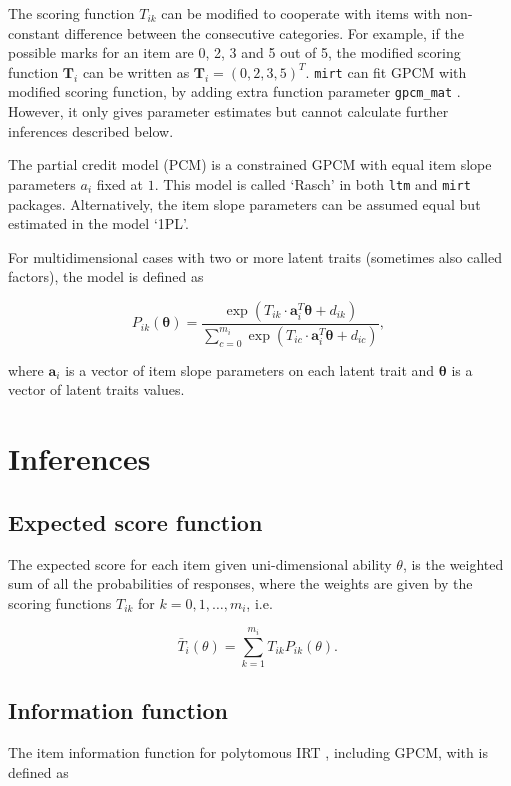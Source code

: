 \documentclass[a4paper]{report}
\begin{document}
The scoring function $T_{ik}$ can be modified to cooperate with items with non-constant difference between the consecutive categories. For example, if the possible marks for an item are 0, 2, 3 and 5 out of 5, the modified scoring function $\boldsymbol T_i$ can be written as $\boldsymbol T_i = (0,2,3,5)^T$. \texttt{mirt} can fit GPCM with modified scoring function, by adding extra function parameter \texttt{gpcm\_mat} \cite{mirt}. However, it only gives parameter estimates but cannot calculate further inferences described below. 

The partial credit model (PCM) is a constrained GPCM with equal item slope parameters $a_i$ fixed at $1$. This model is called `Rasch' in both \texttt{ltm} and \texttt{mirt} packages. Alternatively, the item slope parameters can be assumed equal but estimated in the model `1PL'. 

For multidimensional cases with two or more latent traits (sometimes also called factors), the model is defined as 

$$P_{ik}(\boldsymbol\theta) = \frac{\displaystyle \exp \left( T_{ik} \cdot \boldsymbol{a}_i^T \boldsymbol\theta + d_{ik} \right)}{\displaystyle \sum_{c=0}^{m_i} \exp \left( T_{ic} \cdot \boldsymbol{a}_i^T \boldsymbol\theta + d_{ic} \right)} \text{, }$$

\noindent
where $\boldsymbol{a}_i$ is a vector of item slope parameters on each latent trait and $\boldsymbol\theta$ is a vector of latent traits values. 

\section{Inferences}

\subsection{Expected score function}

The expected score for each item given uni-dimensional ability $\theta$, is the weighted sum of all the probabilities of responses, where the weights are given by the scoring functions $T_{ik}$ for $k=0,1,\ldots,m_i$, i.e. 

$$\bar{T}_i (\theta) = \sum_{k=1}^{m_i} T_{ik} P_{ik}(\theta) \text{. }$$

\subsection{Information function}
The item information function for polytomous IRT \cite{gpcmiic}, including GPCM, with is defined as
\end{document}
